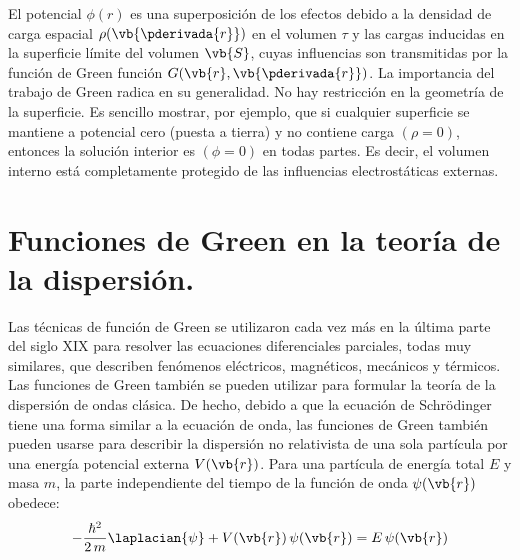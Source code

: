 El potencial $\phi (r)$ es una superposición de los efectos debido a la densidad de carga espacial $\rho (\vb{\pderivada{r}})$ en el volumen $\tau$ y las cargas inducidas en la superficie límite del volumen $\vb{S}$, cuyas influencias son transmitidas por la función de Green función $G (\vb{r}, \vb{\pderivada{r}})$. La importancia del trabajo de Green radica en su generalidad. No hay restricción en la geometría de la superficie. Es sencillo mostrar, por ejemplo, que si cualquier superficie se mantiene a potencial cero (puesta a tierra) y no contiene carga $(\rho = 0)$, entonces la solución interior es $(\phi = 0)$ en todas partes. Es decir, el volumen interno está completamente protegido de las influencias electrostáticas externas.

\section{Funciones de Green en la teoría de la dispersión.}

Las técnicas de función de Green se utilizaron cada vez más en la última parte del siglo XIX para resolver las ecuaciones diferenciales parciales, todas muy similares, que describen fenómenos eléctricos, magnéticos, mecánicos y térmicos. Las funciones de Green también se pueden utilizar para formular la teoría de la dispersión de ondas clásica. De hecho, debido a que la ecuación de Schrödinger tiene una forma similar a la ecuación de onda, las funciones de Green también pueden usarse para describir la dispersión no relativista de una sola partícula por una energía potencial externa $V (\vb{r})$. Para una partícula de energía total $E$ y masa $m$, la parte independiente del tiempo de la función de onda $\psi (\vb{r})$ obedece:
\begin{align}
- \dfrac{\hbar^{2}}{2 \, m} \laplacian{\psi} + V (\vb{r}) \, \psi (\vb{r}) = E \, \psi (\vb{r})
\label{eq:ecuacion_03}
\end{align}

